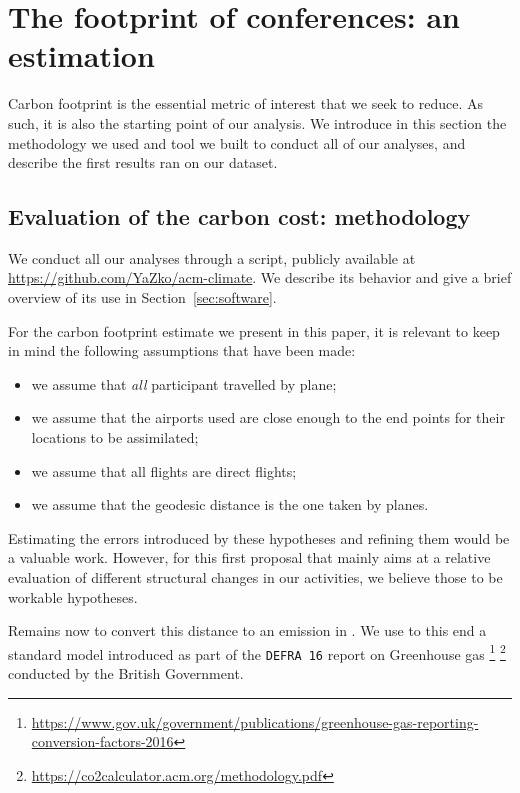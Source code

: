 \section{The footprint of conferences: an estimation}

Carbon footprint is the essential metric of interest that we seek to reduce.
As such, it is also the starting point of our analysis.
We introduce in this section the methodology we used and tool we built to
conduct all of our analyses, and describe the first results ran on our dataset.

\subsection{Evaluation of the carbon cost: methodology}
\label{sec:methodo}

We conduct all our analyses through a \python{} script, publicly available at
\url{https://github.com/YaZko/acm-climate}. We describe its behavior and give
a brief overview of its use in Section~\ref{sec:software}.

For the carbon footprint estimate we present in this paper,
it is relevant to keep in mind the following assumptions that have
been made:
\begin{itemize}
\item we assume that \emph{all} participant travelled by plane;
\item we assume that the airports used are close enough to the end points for their locations to be assimilated;
\item we assume that all flights are direct flights;
\item we assume that the geodesic distance is the one taken by planes.
\end{itemize}

Estimating the errors introduced by these hypotheses and refining them would be
a valuable work. However, for this first proposal that mainly aims at a relative
evaluation of different structural changes in our activities, we believe those
to be workable hypotheses.

Remains now to convert this distance to an emission in \gaz. We use to this end
a standard model introduced as part of the \texttt{DEFRA 16} report on
Greenhouse gas
\footnote{\url{https://www.gov.uk/government/publications/greenhouse-gas-reporting-conversion-factors-2016}}
\footnote{\url{https://co2calculator.acm.org/methodology.pdf}}
conducted by the British Government.


